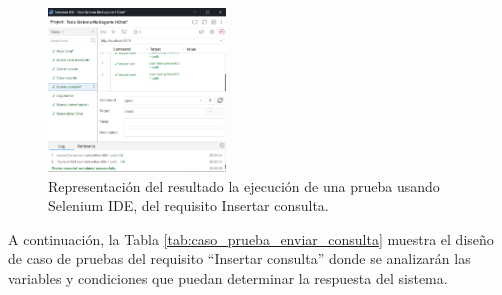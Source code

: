 \begin{figure}[htbp] %
	\centering
	\includegraphics[width=0.42\textwidth]{images/Pruebas_funcionales.PNG} 
	\caption{Representación del resultado la ejecución de una prueba usando Selenium IDE, del requisito Insertar consulta.}
	\label{fig:unit_test}
\end{figure}

A continuación, la Tabla \ref{tab:caso_prueba_enviar_consulta}  muestra el diseño de caso de pruebas del requisito “Insertar consulta” donde se analizarán las variables y condiciones que puedan determinar la respuesta del sistema.


